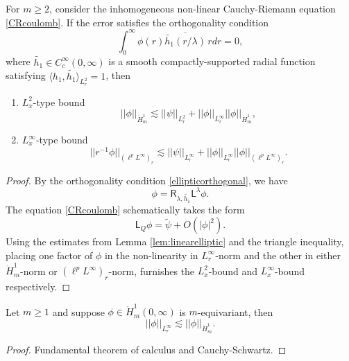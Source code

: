 \begin{proposition}
    For $m \geq 2$, consider the inhomogeneous non-linear Cauchy-Riemann equation \eqref{CRcoulomb}. If the error satisfies the orthogonality condition 
        \begin{equation}\label{eq:ellipticorthogonal}
            \int_0^\infty \phi (r) \overline{\widetilde{h_1}(r/\lambda)} \, r dr 
                = 0,
        \end{equation}
    where $\widetilde{h_1} \in C^\infty_c (0, \infty)$ is a smooth compactly-supported radial function satisfying $\langle h_1, \widetilde{h_1} \rangle_{L^2_r} = 1$, then 
        \begin{enumerate}
            \item $L^2_x$-type bound 
                \begin{equation}
                    ||\phi||_{\dot H^1_m}    
                        \lesssim || \psi ||_{L^2_r} + ||\phi||_{L^\infty_r} ||\phi||_{\dot H^1_m}, \label{eq:ellipticenergy}
                \end{equation}

            \item $L^\infty_x$-type bound
                \begin{equation}
                    ||r^{-1} \phi ||_{(\ell^p L^\infty)_r} 
                        \lesssim ||\psi ||_{L^\infty_r} + ||\phi||_{L^\infty_r} ||\phi||_{(\ell^p L^\infty)_r}.\label{eq:ellipticuniform}
                \end{equation}
        \end{enumerate}
 \end{proposition}

\begin{proof}
    By the orthogonality condition \eqref{ellipticorthogonal}, we have 
        \[
            \phi 
                = \mathsf R_{\lambda, \widetilde{h_1}} \mathsf L^\lambda \phi. 
        \]
    The equation \eqref{CRcoulomb} schematically takes the form 
        \[
            \mathsf L_Q \phi  
                = \widetilde{\psi} + O(|\phi|^2).
        \]
    Using the estimates from Lemma \ref{lem:linearelliptic} and the triangle inequality, placing one factor of $\phi$ in the non-linearity in $L^\infty_r$-norm and the other in either $\dot H^1_m$-norm or $(\ell^p L^\infty)_r$-norm, furnishes the $L^2_x$-bound and $L^\infty_x$-bound respectively. 
\end{proof}


\begin{proposition}
    Let $m \geq 1$ and suppose $\phi \in \dot H^1_m (0, \infty)$ is $m$-equivariant, then 
        \begin{equation}
            ||\phi||_{L^\infty_r}
                \lesssim ||\phi||_{\dot H^1_m}\label{eq:elliptichardy}.
        \end{equation}
\end{proposition}

\begin{proof}
    Fundamental theorem of calculus and Cauchy-Schwartz. 
\end{proof}